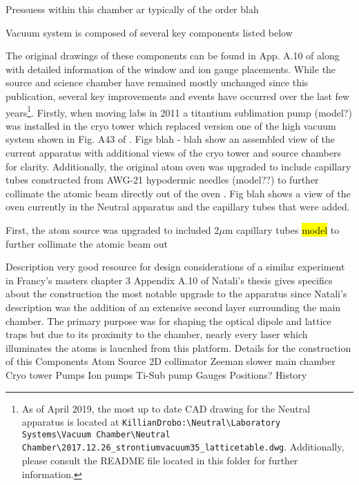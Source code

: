 Pressuess within this chamber ar typically of the order blah


	

\noindent Vacuum system is composed of several key components listed below


The original drawings of these components can be found in App. A.10 of \cite{MartinezdeEscolar2010} along with detailed information of the window and ion gauge placements. 
While the source and science chamber have remained mostly unchanged since this publication, several key improvements and events have occurred over the last few years\footnote{As of April 2019, the most up to date CAD drawing for the Neutral apparatus is located at \texttt{KillianDrobo:\textbackslash Neutral\textbackslash Laboratory Systems\textbackslash Vacuum Chamber\textbackslash Neutral Chamber\textbackslash 2017.12.26\_strontiumvacuum35\_latticetable.dwg}. Additionally, please consult the README file located in this folder for further information.}.
Firstly, when moving labs in 2011 a titantium sublimation pump (model?) was installed in the cryo tower which replaced version one of the high vacuum system shown in Fig. A43 of \cite{MartinezdeEscolar2010}. 
Figs blah - blah show an assembled view of the current apparatus with additional views of the cryo tower and source chambers for clarity. 
Additionally, the original atom oven was upgraded to include capillary tubes constructed from AWG-21 hypodermic needles (model??) to further collimate the atomic beam directly out of the oven \cite{Mazurenko2010}. Fig blah shows a view of the oven currently in the Neutral apparatus and the capillary tubes that were added.




First, the atom source was upgraded to included 2$\mu$m capillary tubes \hl{model} to further collimate the atomic beam out 


Description
	very good resource for design considerations of a similar experiment in Francy's masters chapter 3
	Appendix A.10 of Natali's thesis gives specifics about the construction
		the most notable upgrade to the apparatus since Natali's description was the addition of an extensive second layer surrounding the main chamber. The primary purpose was for shaping the optical dipole and lattice traps but due to its proximity to the chamber, nearly every laser which illuminates the atoms is laucnhed from this platform. Details for the construction of this 
Components
	Atom Source
	2D collimator
	Zeeman slower
	main chamber
	Cryo tower
	Pumps
		Ion pumps
		Ti-Sub pump
	Gauges
		Positions?
History
	
